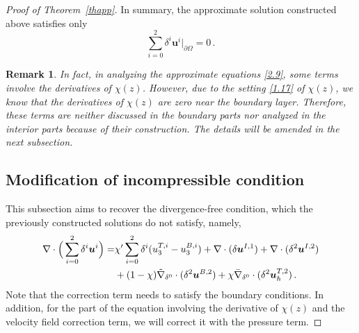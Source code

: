 \documentclass[pdflatex,sn-mathphys-num]{sn-jnl}%
\theoremstyle{thmstyleone}%
\theoremstyle{thmstyletwo}%
\newtheorem{remark}{Remark}%
\theoremstyle{thmstylethree}%
\theoremstyle{thmstyletwo}
\begin{document}
\begin{proof}[Proof of Theorem~{\upshape\ref{thapp}}]
In summary, the approximate solution constructed above satisfies only
\begin{equation}\label{2.34}
	\sum_{i=0}^{2}{\delta}^i
	\boldsymbol u^{i}|_{\partial\Omega}=0\,.
\end{equation}

\begin{remark}
	In fact, in analyzing the approximate equations \eqref{2.9}, some terms involve the derivatives of $\chi(z)$. However, due to the setting \eqref{1.17} of $\chi(z)$, we know that the derivatives of $\chi(z)$ are zero near the boundary layer. Therefore, these terms are neither discussed in the boundary parts nor analyzed in the interior parts because of their construction. The details will be amended in the next subsection.
\end{remark}


\subsection{Modification of incompressible condition}\label{subsec2.3}
This subsection aims to recover the divergence-free condition, which the previously constructed solutions do not satisfy, namely,
\begin{align}\label{2.35}
	\nabla\cdot \Big(\sum_{i=0}^{2}{\delta}^i
	\boldsymbol u^{i}\Big)
	=&\chi'\sum_{i=0}^{2}{\delta}^i
	(u_3^{T,i}-u_3^{B,i})
	+\nabla\cdot(\delta\boldsymbol{u}^{I,1})
	+
	\nabla\cdot(\delta^2\boldsymbol{u}^{I,2})
	\notag\\
	&+
	(1-\chi)\tilde{\nabla}_{\delta^0}\cdot(\delta^2\boldsymbol u^{B,2})
	+\chi\bar{\nabla}_{\delta^0}\cdot(\delta^2\boldsymbol u_h^{T,2})
	\,.
\end{align}
Note that the correction term needs to satisfy the boundary conditions.
In addition, for the part of the equation involving the derivative of $\chi(z)$ and the velocity field correction term, we will correct it with the pressure term.









\end{proof}
\end{document}
